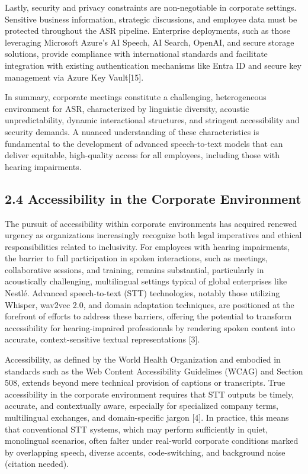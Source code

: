 \documentclass[12pt,a4paper]{article}
\begin{document}
Lastly, security and privacy constraints are non-negotiable in corporate settings. Sensitive business information, strategic discussions, and employee data must be protected throughout the ASR pipeline. Enterprise deployments, such as those leveraging Microsoft Azure’s AI Speech, AI Search, OpenAI, and secure storage solutions, provide compliance with international standards and facilitate integration with existing authentication mechanisms like Entra ID and secure key management via Azure Key Vault[15].


In summary, corporate meetings constitute a challenging, heterogeneous environment for ASR, characterized by linguistic diversity, acoustic unpredictability, dynamic interactional structures, and stringent accessibility and security demands. A nuanced understanding of these characteristics is fundamental to the development of advanced speech-to-text models that can deliver equitable, high-quality access for all employees, including those with hearing impairments.


\subsection{2.4 Accessibility in the Corporate Environment}


The pursuit of accessibility within corporate environments has acquired renewed urgency as organizations increasingly recognize both legal imperatives and ethical responsibilities related to inclusivity. For employees with hearing impairments, the barrier to full participation in spoken interactions, such as meetings, collaborative sessions, and training, remains substantial, particularly in acoustically challenging, multilingual settings typical of global enterprises like Nestlé. Advanced speech-to-text (STT) technologies, notably those utilizing Whisper, wav2vec 2.0, and domain adaptation techniques, are positioned at the forefront of efforts to address these barriers, offering the potential to transform accessibility for hearing-impaired professionals by rendering spoken content into accurate, context-sensitive textual representations [3].


Accessibility, as defined by the World Health Organization and embodied in standards such as the Web Content Accessibility Guidelines (WCAG) and Section 508, extends beyond mere technical provision of captions or transcripts. True accessibility in the corporate environment requires that STT outputs be timely, accurate, and contextually aware, especially for specialized company terms, multilingual exchanges, and domain-specific jargon [4]. In practice, this means that conventional STT systems, which may perform sufficiently in quiet, monolingual scenarios, often falter under real-world corporate conditions marked by overlapping speech, diverse accents, code-switching, and background noise (citation needed).
\end{document}
